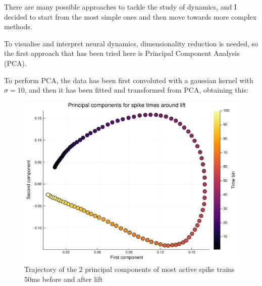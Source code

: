 There are many possible approaches to tackle the study of dynamics, and I decided to start from the most simple ones and then move towards more complex methods.

To visualise and interpret neural dynamics, dimensionality reduction is needed, so the first approach that has been tried here is Principal Component Analysis (PCA).

To perform PCA, the data has been first convoluted with a gaussian kernel with $\sigma=10$, and then it has been fitted and transformed from PCA, obtaining this:

\begin{figure}[h]
	\centering
	\includegraphics[scale=0.5]{../../plots/PCA-100.pdf}
	\caption{Trajectory of the 2 principal components of most active spike trains 50ms before and after lift}
	\label{fig:pca-100}
\end{figure}






